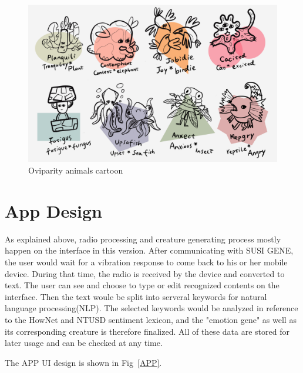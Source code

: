 \documentclass[manuscript,screen]{acmart}
\begin{document}
\begin{figure}[h]
  \centering
  \includegraphics[width=\linewidth]{Animals.png}
  \caption{Oviparity animals cartoon}
  \label{Animals}
\end{figure}

\section{App Design}

As explained above, radio processing and creature generating process mostly happen on the interface in this version. After communicating with SUSI GENE, the user would wait for a vibration response to come back to his or her mobile device. During that time, the radio is received by the device and converted to text. The user can see and choose to type or edit recognized contents on the interface. Then the text woule be split into serveral keywords for natural language processing(NLP). The selected keywords would be analyzed in reference to the HowNet and NTUSD sentiment lexicon, and the "emotion gene" as well as its corresponding creature is therefore finalized. All of these data are stored for later usage and can be checked at any time.

The APP UI design is shown in Fig~\ref{APP}.
\end{document}
